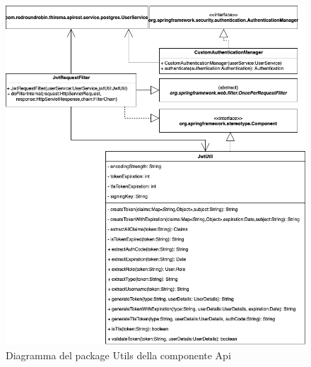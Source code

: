 		
		\begin{figure}[H]
			\centering
			\includegraphics[scale=0.550]{res/images/API/UtilsPackage.png}
			\caption{Diagramma del package Utils della componente Api}
		\end{figure}
